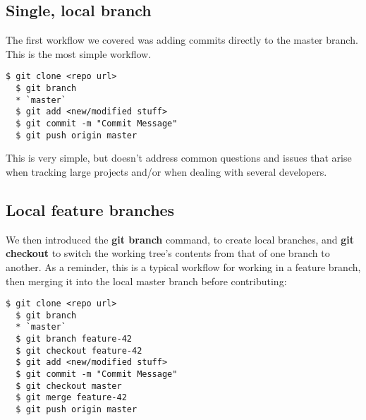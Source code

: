 \documentclass{../common/tufte-latex/tufte-handout}
\begin{document}
\subsection{Single, local branch}
The first workflow we covered was adding commits directly to the master branch.
This is the most simple workflow.
\begin{lstlisting}[style=BashInputStyle]
  $ git clone <repo url>
  $ git branch
  * `master`
  $ git add <new/modified stuff>
  $ git commit -m "Commit Message"
  $ git push origin master
\end{lstlisting}

This is very simple, but doesn't address common questions and issues that arise when tracking large projects and/or when dealing with several developers.

\subsection{Local feature branches}
We then introduced the \textbf{git branch} command, to create local branches, and \textbf{git checkout} to switch the working tree's contents from that of one branch to another.
As a reminder, this is a typical workflow for working in a feature branch, then merging it into the local master branch before contributing:

\begin{lstlisting}[style=BashInputStyle]
  $ git clone <repo url>
  $ git branch
  * `master`
  $ git branch feature-42 
  $ git checkout feature-42
  $ git add <new/modified stuff>
  $ git commit -m "Commit Message"
  $ git checkout master
  $ git merge feature-42
  $ git push origin master
\end{lstlisting}



\end{document}
